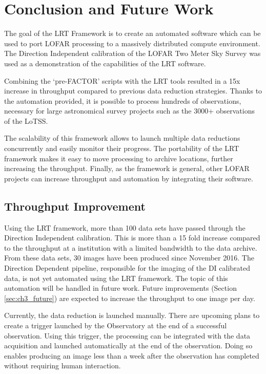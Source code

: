 \section{Conclusion and Future Work}\label{sec:ch3_conclusion}

The goal of the LRT Framework is to create an automated software which can be used to port LOFAR processing to a massively distributed compute environment. The Direction Independent calibration of the LOFAR Two Meter Sky Survey was used as a demonstration of the capabilities of the LRT software. 

Combining the `pre-FACTOR' scripts with the LRT tools resulted in a 15x increase in throughput compared to previous data reduction strategies. Thanks to the automation provided, it is possible to process hundreds of observations, necessary for large astronomical survey projects such as the 3000+ observations of the LoTSS. 

The scalability of this framework allows to launch multiple data reductions concurrently and easily monitor their progress. The portability of the LRT framework makes it easy to move processing to archive locations, further increasing the throughput. Finally, as the framework is general, other LOFAR projects can increase throughput and automation by integrating their software. 


\subsection{Throughput Improvement}

Using the LRT framework, more than 100 data sets have passed through the Direction Independent calibration. This is more than a 15 fold increase compared to the throughput at a institution with a limited bandwidth to the data archive. From these data sets, 30 images have been produced since November 2016.  The Direction Dependent pipeline, responsible for the imaging of the DI calibrated data, is not yet automated using the LRT framework. The topic of this automation will be handled in future work. Future improvements (Section \ref{sec:ch3_future}) are expected to increase the throughput to one image per day.  

Currently, the data reduction is launched manually. There are upcoming plans to create a trigger launched by the Observatory at the end of a successful observation. Using this trigger, the processing can be integrated with the data acquisition and launched automatically at the end of the observation. Doing so enables producing an image less than a week after the observation has completed without requiring human interaction. 
% 
